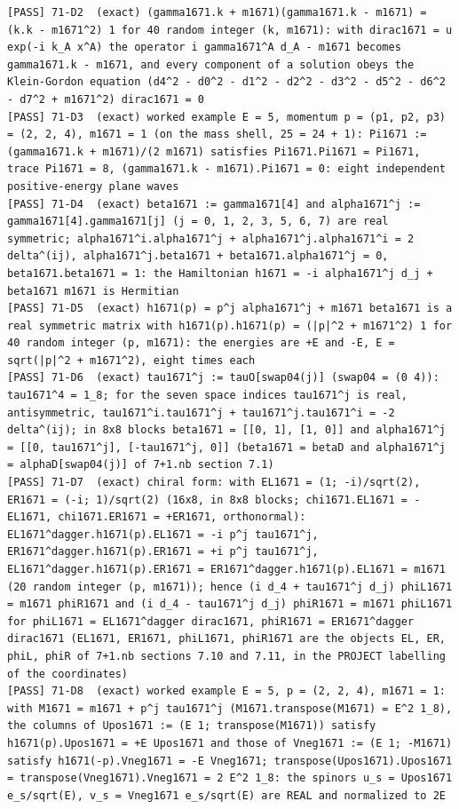 \documentclass[
  10pt,
]{article}
\begin{document}
\begin{verbatim}
[PASS] 71-D2  (exact) (gamma1671.k + m1671)(gamma1671.k - m1671) = (k.k - m1671^2) 1 for 40 random integer (k, m1671): with dirac1671 = u exp(-i k_A x^A) the operator i gamma1671^A d_A - m1671 becomes gamma1671.k - m1671, and every component of a solution obeys the Klein-Gordon equation (d4^2 - d0^2 - d1^2 - d2^2 - d3^2 - d5^2 - d6^2 - d7^2 + m1671^2) dirac1671 = 0
[PASS] 71-D3  (exact) worked example E = 5, momentum p = (p1, p2, p3) = (2, 2, 4), m1671 = 1 (on the mass shell, 25 = 24 + 1): Pi1671 := (gamma1671.k + m1671)/(2 m1671) satisfies Pi1671.Pi1671 = Pi1671, trace Pi1671 = 8, (gamma1671.k - m1671).Pi1671 = 0: eight independent positive-energy plane waves
[PASS] 71-D4  (exact) beta1671 := gamma1671[4] and alpha1671^j := gamma1671[4].gamma1671[j] (j = 0, 1, 2, 3, 5, 6, 7) are real symmetric; alpha1671^i.alpha1671^j + alpha1671^j.alpha1671^i = 2 delta^(ij), alpha1671^j.beta1671 + beta1671.alpha1671^j = 0, beta1671.beta1671 = 1: the Hamiltonian h1671 = -i alpha1671^j d_j + beta1671 m1671 is Hermitian
[PASS] 71-D5  (exact) h1671(p) = p^j alpha1671^j + m1671 beta1671 is a real symmetric matrix with h1671(p).h1671(p) = (|p|^2 + m1671^2) 1 for 40 random integer (p, m1671): the energies are +E and -E, E = sqrt(|p|^2 + m1671^2), eight times each
[PASS] 71-D6  (exact) tau1671^j := tauO[swap04(j)] (swap04 = (0 4)): tau1671^4 = 1_8; for the seven space indices tau1671^j is real, antisymmetric, tau1671^i.tau1671^j + tau1671^j.tau1671^i = -2 delta^(ij); in 8x8 blocks beta1671 = [[0, 1], [1, 0]] and alpha1671^j = [[0, tau1671^j], [-tau1671^j, 0]] (beta1671 = betaD and alpha1671^j = alphaD[swap04(j)] of 7+1.nb section 7.1)
[PASS] 71-D7  (exact) chiral form: with EL1671 = (1; -i)/sqrt(2), ER1671 = (-i; 1)/sqrt(2) (16x8, in 8x8 blocks; chi1671.EL1671 = -EL1671, chi1671.ER1671 = +ER1671, orthonormal): EL1671^dagger.h1671(p).EL1671 = -i p^j tau1671^j, ER1671^dagger.h1671(p).ER1671 = +i p^j tau1671^j, EL1671^dagger.h1671(p).ER1671 = ER1671^dagger.h1671(p).EL1671 = m1671 (20 random integer (p, m1671)); hence (i d_4 + tau1671^j d_j) phiL1671 = m1671 phiR1671 and (i d_4 - tau1671^j d_j) phiR1671 = m1671 phiL1671 for phiL1671 = EL1671^dagger dirac1671, phiR1671 = ER1671^dagger dirac1671 (EL1671, ER1671, phiL1671, phiR1671 are the objects EL, ER, phiL, phiR of 7+1.nb sections 7.10 and 7.11, in the PROJECT labelling of the coordinates)
[PASS] 71-D8  (exact) worked example E = 5, p = (2, 2, 4), m1671 = 1: with M1671 = m1671 + p^j tau1671^j (M1671.transpose(M1671) = E^2 1_8), the columns of Upos1671 := (E 1; transpose(M1671)) satisfy h1671(p).Upos1671 = +E Upos1671 and those of Vneg1671 := (E 1; -M1671) satisfy h1671(-p).Vneg1671 = -E Vneg1671; transpose(Upos1671).Upos1671 = transpose(Vneg1671).Vneg1671 = 2 E^2 1_8: the spinors u_s = Upos1671 e_s/sqrt(E), v_s = Vneg1671 e_s/sqrt(E) are REAL and normalized to 2E

\end{verbatim}
\end{document}
